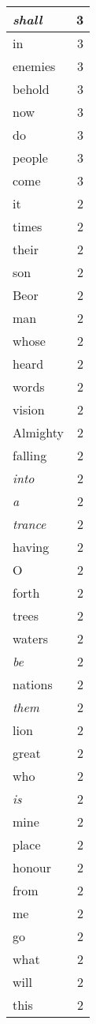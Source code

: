 \begin{center}
\begin{longtable}{l|r}
\emph{shall} & 3\\ \hline 
in & 3\\ \hline 
enemies & 3\\ \hline 
behold & 3\\ \hline 
now & 3\\ \hline 
do & 3\\ \hline 
people & 3\\ \hline 
come & 3\\ \hline 
it & 2\\ \hline 
times & 2\\ \hline 
their & 2\\ \hline 
son & 2\\ \hline 
Beor & 2\\ \hline 
man & 2\\ \hline 
whose & 2\\ \hline 
heard & 2\\ \hline 
words & 2\\ \hline 
vision & 2\\ \hline 
Almighty & 2\\ \hline 
falling & 2\\ \hline 
\emph{into} & 2\\ \hline 
\emph{a} & 2\\ \hline 
\emph{trance} & 2\\ \hline 
having & 2\\ \hline 
O & 2\\ \hline 
forth & 2\\ \hline 
trees & 2\\ \hline 
waters & 2\\ \hline 
\emph{be} & 2\\ \hline 
nations & 2\\ \hline 
\emph{them} & 2\\ \hline 
lion & 2\\ \hline 
great & 2\\ \hline 
who & 2\\ \hline 
\emph{is} & 2\\ \hline 
mine & 2\\ \hline 
place & 2\\ \hline 
honour & 2\\ \hline 
from & 2\\ \hline 
me & 2\\ \hline 
go & 2\\ \hline 
what & 2\\ \hline 
will & 2\\ \hline 
this & 2\\ \hline 

\end{longtable}
\end{center}

